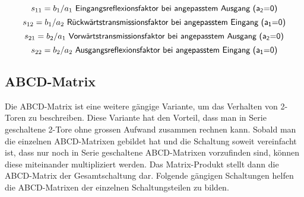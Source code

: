 \begin{equation}\label{equ:def_s11}
	s_{11} = b_1/a_1\textsf{ Eingangsreflexionsfaktor bei angepasstem Ausgang (a\textsubscript{2}=0)}
\end{equation}
\begin{equation}\label{equ:def_s12}
	s_{12} = b_1/a_2\textsf{ Rückwärtstransmissionsfaktor bei angepasstem Eingang (a\textsubscript{1}=0)}
\end{equation}
\begin{equation}\label{equ:def_s21}
	s_{21} = b_2/a_1\textsf{ Vorwärtstransmissionsfaktor bei angepasstem Ausgang (a\textsubscript{2}=0)}
\end{equation}
\begin{equation}\label{equ:def_s22}
	s_{22} = b_2/a_2\textsf{ Ausgangsreflexionsfaktor bei angepasstem Eingang (a\textsubscript{1}=0)}
\end{equation}
\newpage

\subsection{ABCD-Matrix}\label{ABCD-Matrix}
Die ABCD-Matrix ist eine weitere gängige Variante, um das Verhalten von 2-Toren zu beschreiben. Diese Variante hat den Vorteil, dass man in Serie geschaltene 2-Tore ohne grossen Aufwand zusammen rechnen kann. Sobald man die einzelnen ABCD-Matrixen gebildet hat und die Schaltung soweit vereinfacht ist, dass nur noch in Serie geschaltene ABCD-Matrixen vorzufinden sind, können diese miteinander multipliziert werden. Das Matrix-Produkt stellt dann die ABCD-Matrix der Gesamtschaltung dar. Folgende gängigen Schaltungen helfen die ABCD-Matrixen der einzelnen Schaltungsteilen zu bilden.

